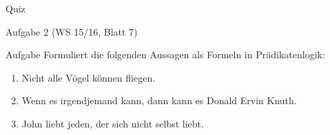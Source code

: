 \begin{frame}{Quiz}
\begin{figure}[h!]
	\hspace{2em}
\end{figure} 
\end{frame}

\begin{frame}{Aufgabe 2 (WS 15/16, Blatt 7)}
	\begin{block}{Aufgabe}
		Formuliert die folgenden Aussagen als Formeln in Prädikatenlogik:
		\begin{enumerate}
			\item Nicht alle Vögel können fliegen.
			\item Wenn es irgendjemand kann, dann kann es Donald Ervin Knuth.
			\item John liebt jeden, der sich nicht selbst liebt.
		\end{enumerate}
	\end{block}
	
\end{frame}


